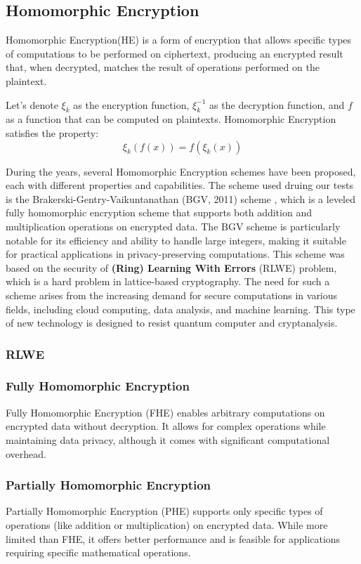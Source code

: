 \subsection{Homomorphic Encryption}
Homomorphic Encryption(HE) is a form of encryption that allows specific types of computations to be performed on ciphertext, producing an encrypted result that, when decrypted, matches the result of operations performed on the plaintext.

Let's denote \( \xi_k \) as the encryption function, \( \xi_k^{-1} \) as the decryption function, and \( f \) as a function that can be computed on plaintexts. Homomorphic Encryption satisfies the property:
\[
    \xi_k(f(x)) = f(\xi_k(x))
\]

During the years, several Homomorphic Encryption schemes have been proposed, each with different properties and capabilities. The scheme used druing our tests is the Brakerski-Gentry-Vaikuntanathan (BGV, 2011) scheme \cite{Brakerski2012-wj}, which is a leveled fully homomorphic encryption scheme that supports both addition and multiplication operations on encrypted data. The BGV scheme is particularly notable for its efficiency and ability to handle large integers, making it suitable for practical applications in privacy-preserving computations.
This scheme was based on the security of \textbf{(Ring) Learning With Errors} (RLWE) problem, which is a hard problem in lattice-based cryptography. The need for such a scheme arises from the increasing demand for secure computations in various fields, including cloud computing, data analysis, and machine learning. This type of new technology is designed to resist quantum computer and cryptanalysis. 
\subsubsection{RLWE}

\subsubsection{Fully Homomorphic Encryption}
Fully Homomorphic Encryption (FHE) enables arbitrary computations on encrypted data without decryption. It allows for complex operations while maintaining data privacy, although it comes with significant computational overhead.

\subsubsection{Partially Homomorphic Encryption}
Partially Homomorphic Encryption (PHE) supports only specific types of operations (like addition or multiplication) on encrypted data. While more limited than FHE, it offers better performance and is feasible for applications requiring specific mathematical operations.

